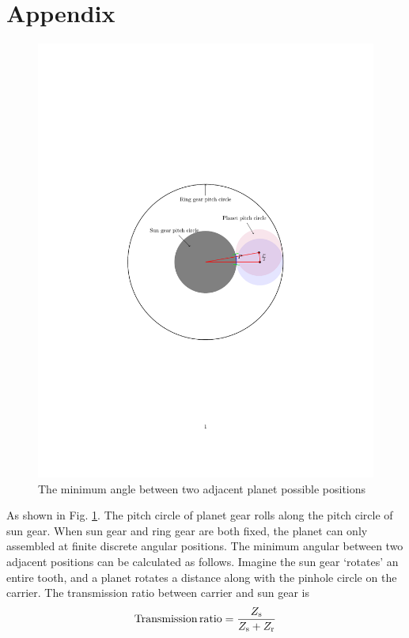 \documentclass[a4paper,fleqn]{cas-sc}%
\begin{document}
\section*{Appendix\label{Appendix}}
\begin{figure}[pos=htbp]
    \centering
    \includegraphics[scale=0.5]{Minimum_angle.pdf}
    \caption{The minimum angle between two adjacent planet possible positions}
    \label{fig_mini_angle}
\end{figure}
\par As shown in Fig. \ref{fig_mini_angle}. The pitch circle of planet gear rolls along the pitch circle of sun gear. When sun gear and ring gear are both fixed, the planet can only assembled at finite discrete angular positions. The minimum angular between two adjacent positions can be calculated as follows. Imagine the sun gear `rotates' an entire tooth, and a planet rotates a distance along with the pinhole circle on the carrier. The transmission ratio between carrier and sun gear is
\begin{equation}
    \operatorname{Transmission\,ratio}=\frac{Z_{\rm s}}{Z_{\rm s}+Z_{\rm r}}
\end{equation}
\end{document}
